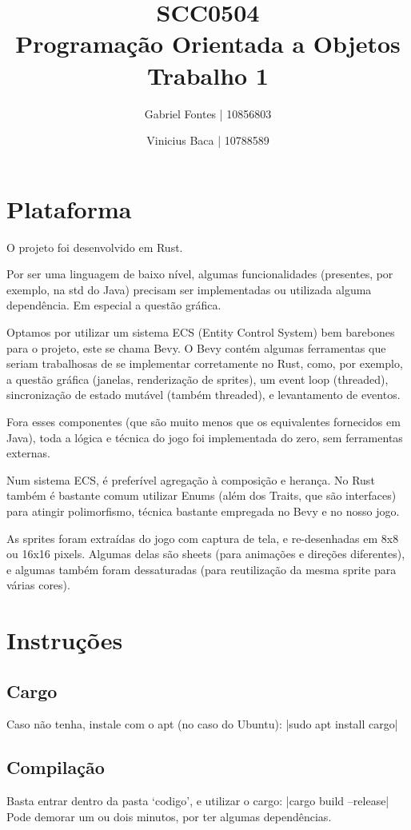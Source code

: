\documentclass[12pt]{article}
\title{SCC0504 \\ Programação Orientada a Objetos \\ Trabalho 1}
\author{Gabriel Fontes | 10856803
    \and
    Vinicius Baca | 10788589
    }
\begin{document}
\maketitle

\section{Plataforma}
O projeto foi desenvolvido em Rust.

Por ser uma linguagem de baixo nível, algumas funcionalidades (presentes, por exemplo, na std do Java) precisam ser implementadas ou utilizada alguma dependência. Em especial a questão gráfica.

Optamos por utilizar um sistema ECS (Entity Control System) bem barebones para o projeto, este se chama Bevy. O Bevy contém algumas ferramentas que seriam trabalhosas de se implementar corretamente no Rust, como, por exemplo, a questão gráfica (janelas, renderização de sprites), um event loop (threaded), sincronização de estado mutável (também threaded), e levantamento de eventos.

Fora esses componentes (que são muito menos que os equivalentes fornecidos em Java), toda a lógica e técnica do jogo foi implementada do zero, sem ferramentas externas.

Num sistema ECS, é preferível agregação à composição e herança. No Rust também é bastante comum utilizar Enums (além dos Traits, que são interfaces) para atingir polimorfismo, técnica bastante empregada no Bevy e no nosso jogo.

As sprites foram extraídas do jogo com captura de tela, e re-desenhadas em 8x8 ou 16x16 pixels. Algumas delas são sheets (para animações e direções diferentes), e algumas também foram dessaturadas (para reutilização da mesma sprite para várias cores).

\section{Instruções}
\subsection{Cargo}
Caso não tenha, instale com o apt (no caso do Ubuntu):
|sudo apt install cargo|

\subsection{Compilação}
Basta entrar dentro da pasta `codigo', e utilizar o cargo:
|cargo build --release|
Pode demorar um ou dois minutos, por ter algumas dependências.
\end{document}

